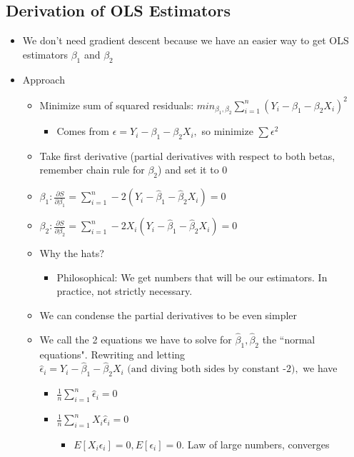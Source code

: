 \documentclass[10pt, oneside]{article}
\begin{document}
\subsection{Derivation of OLS Estimators}
\begin{itemize}
    \item We don't need gradient descent because we have an easier way to get OLS estimators $\beta_1$ and $\beta_2$
    \item Approach
    \begin{itemize}
        \item Minimize sum of squared residuals: $min_{\beta_1, \beta_2} \sum ^n _{i=1} (Y_i - \beta_1 -\beta_2 X_i)^2$
        \begin{itemize}
            \item Comes from $\epsilon =Y_i - \beta_1 -\beta_2 X_i,$ so minimize $\sum \epsilon^2$
        \end{itemize}
        \item Take first derivative (partial derivatives with respect to both betas, remember chain rule for $\beta_2$) and set it to 0
        \item $\beta_1: \frac{\partial S}{\partial \beta_1} = \sum_{i=1} ^ n -2(Y_i -\hat \beta_1 -\hat \beta_2 X_i) = 0$
        \item $\beta_2: \frac{\partial S}{\partial \beta_2} = \sum_{i=1} ^ n -2X_i(Y_i -\hat \beta_1 -\hat \beta_2 X_i) = 0$
        \item Why the hats?
        \begin{itemize}
            \item Philosophical: We get numbers that will be our estimators. In practice, not strictly necessary.
        \end{itemize}
        \item We can condense the partial derivatives to be even simpler
        \item We call the 2 equations we have to solve for $\hat \beta_1, \hat \beta_2$ the ``normal equations". Rewriting and letting $\hat \epsilon_i=Y_i -\hat \beta_1 -\hat \beta_2 X_i \text{ (and diving both sides by constant -2)},$ we have
        \begin{itemize}
            \item $\frac{1}{n}\sum _{i=1} ^ n \hat \epsilon_i = 0$
            \item $\frac{1}{n} \sum_{i=1} ^ n X_i \hat \epsilon_i =0$
            \begin{itemize}
                \item $E[X_i \epsilon_i] = 0, E[\epsilon_i] = 0$. Law of large numbers, converges

\end{itemize}
\end{itemize}
\end{itemize}
\end{itemize}
\end{document}
